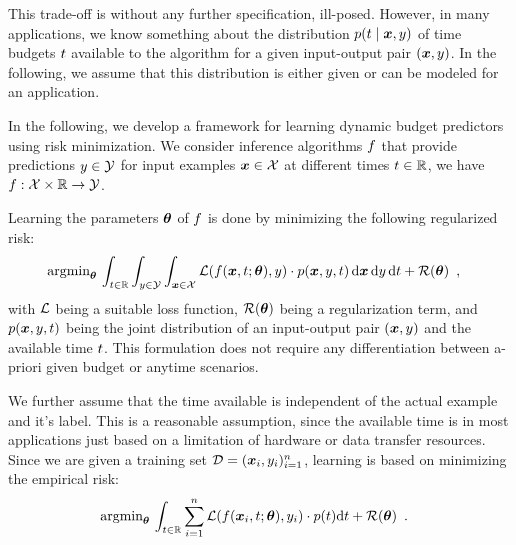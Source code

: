 \documentclass{bmvc2k}
\begin{document}
    This trade-off is without any further specification, ill-posed. However, in many applications,
    we know something about the distribution $p(t \;|\; \bm{x}, y)$
    of time budgets $t$ available to the algorithm for a given input-output pair $(\bm{x}, y)$.
    In the following, we assume that this distribution is either given or can be modeled for
    an application.

    In the following,
    we develop a framework for learning dynamic budget predictors using risk minimization.
    We consider inference algorithms $f$ that provide predictions $y \in \mathcal{Y}$
    for input examples $\bm{x} \in \mathcal{X}$
    at different times $t \in \mathbb{R}$, \ie we have $f: \mathcal{X} \times \mathbb{R} \rightarrow \mathcal{Y}$.

    Learning the parameters $\bm{\theta}$ of $f$
    is done by minimizing the following regularized risk:
    \begin{align}
        \label{eq:emprisk1}
        &\operatorname{\text{argmin}}_{\bm{\theta}}\, \int_{t \in \mathbb{R}} \int_{y \in \mathcal{Y}} \int_{\bm{x} \in \mathcal{X}}
        \mathcal{L}( f(\bm{x}, t; \bm{\theta}), y ) \cdot p(\bm{x}, y, t) \,\mathrm{d}\bm{x}\, \mathrm{d}y\, \mathrm{d} t + \mathcal{R}(\bm{\theta}) \enspace,
    \end{align}
    with $\mathcal{L}$ being a suitable loss function, $\mathcal{R}(\bm{\theta})$ being a regularization term,
    and $p(\bm{x}, y, t)$ being the joint distribution of
    an input-output pair $(\bm{x}, y)$ and the available time $t$.
    This formulation does not require any differentiation between a-priori given budget or anytime scenarios.

    We further assume that the time available is independent of the actual
    example and it's label.
    This is a reasonable assumption, since the available time is in most
    applications just based on a limitation of hardware or data transfer resources.
    Since we are given a training set $\mathcal{D} = (\bm{x}_i, y_i)_{i=1}^{n}$,
    learning is based on minimizing the empirical risk:
    \begin{align}
        \label{eq:emprisk2}
        &\operatorname{\text{argmin}}_{\bm{\theta}}\, \int_{t \in \mathbb{R}} \sum\limits_{i=1}^{n}
        \mathcal{L}( f(\bm{x}_i, t; \bm{\theta}), y_i ) \cdot p(t) \mathrm{d} t + \mathcal{R}(\bm{\theta}) \enspace.
    \end{align}
\end{document}
